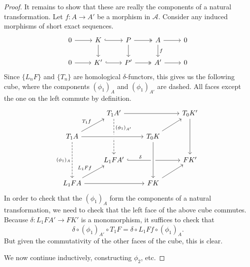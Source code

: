 \documentclass[main.tex]{subfiles}
\begin{document}
\begin{proof}
  It remains to show that these are really the components of a natural transformation. Let $f\colon A \to A'$ be a morphism in $\mathcal{A}$. Consider any induced morphisms of short exact sequences.
  \begin{equation*}
    \begin{tikzcd}
      0
      \arrow[r]
      & K
      \arrow[r, hook]
      \arrow[d]
      & P
      \arrow[r, two heads]
      \arrow[d]
      & A
      \arrow[r]
      \arrow[d, "f"]
      & 0
      \\
      0
      \arrow[r]
      & K'
      \arrow[r, hook]
      & P'
      \arrow[r, two heads]
      & A'
      \arrow[r]
      & 0
    \end{tikzcd}
  \end{equation*}
  Since $\{L_{n}F\}$ and $\{T_{n}\}$ are homological $\delta$-functors, this gives us the following cube, where the components $(\phi_{1})_{A}$ and $(\phi_{1})_{A'}$ are dashed. All faces except the one on the left commute by definition.
  \begin{equation*}
    \begin{tikzcd}
      & T_{1}A'
      \arrow[rr]
      \arrow[dd, dashed, near start, "(\phi_{1})_{A'}"]
      && T_{0}K'
      \arrow[dd]
      \\
      T_{1}A
      \arrow[rr, crossing over]
      \arrow[ur, "T_{1}f"]
      \arrow[dd, dashed, swap, "(\phi_{1})_{A}"]
      && T_{0}K
      \arrow[ur]
      \\
      & L_{1}FA'
      \arrow[rr, near start, hook, "\delta"]
      && FK'
      \\
      L_{1}FA
      \arrow[ur, "L_{1}Ff"]
      \arrow[rr]
      && FK
      \arrow[ur]
      \arrow[from=uu, crossing over]
    \end{tikzcd}
  \end{equation*}
  In order to check that the $(\phi_{1})_{A}$ form the components of a natural transformation, we need to check that the left face of the above cube commutes. Because $\delta\colon L_{1}FA' \to FK'$ is a monomorphism, it suffices to check that
  \begin{equation*}
    \delta \circ (\phi_{1})_{A'} \circ T_{1}F = \delta \circ L_{1}Ff \circ (\phi_{1})_{A}.
  \end{equation*}
  But given the commutativity of the other faces of the cube, this is clear.

  We now continue inductively, constructing $\phi_{2}$, etc.


\end{proof}
\end{document}
